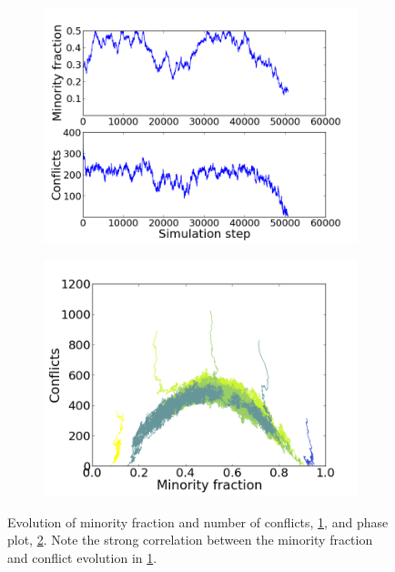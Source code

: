 \documentclass[11pt]{article}
\begin{document}
\begin{figure}[h!]
  \centering
  \begin{subfigure}{.5\textwidth}
    \centering
    \includegraphics[width=1.0\linewidth]{vmSlaving}
    \caption{}
    \label{fig:vmSlave}
  \end{subfigure}%
  \begin{subfigure}{.5\textwidth}
    \centering
    \includegraphics[width=1.0\linewidth]{vmPhasePlotv2}
    \caption{}
    \label{fig:vmPP}
  \end{subfigure}%
  \caption{Evolution of minority fraction and number of conflicts, \ref{fig:vmSlave}, and phase plot, \ref{fig:vmPP}. Note  the strong correlation between the minority fraction and conflict evolution in \ref{fig:vmSlave}.}
  \label{fig:vmResults}
\end{figure}
\end{document}
